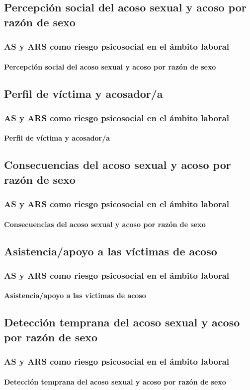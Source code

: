 \documentclass{beamer}
\begin{document}
    \subsection{Percepción social del acoso sexual y acoso por razón de sexo}
    \begin{frame}
		\frametitle{AS y ARS como riesgo psicosocial en el ámbito laboral}
        \framesubtitle{Percepción social del acoso sexual y acoso por razón de sexo}
	\end{frame}

    \subsection{Perfil de víctima y acosador/a}
    \begin{frame}
		\frametitle{AS y ARS como riesgo psicosocial en el ámbito laboral}
        \framesubtitle{Perfil de víctima y acosador/a}
	\end{frame}

    \subsection{Consecuencias del acoso sexual y acoso por razón de sexo}
    \begin{frame}
		\frametitle{AS y ARS como riesgo psicosocial en el ámbito laboral}
        \framesubtitle{Consecuencias del acoso sexual y acoso por razón de sexo}
	\end{frame}

    \subsection{Asistencia/apoyo a las víctimas de acoso}
    \begin{frame}
		\frametitle{AS y ARS como riesgo psicosocial en el ámbito laboral}
        \framesubtitle{Asistencia/apoyo a las víctimas de acoso}
	\end{frame}

    \subsection{Detección temprana del acoso sexual y acoso por razón de sexo}
    \begin{frame}
		\frametitle{AS y ARS como riesgo psicosocial en el ámbito laboral}
        \framesubtitle{Detección temprana del acoso sexual y acoso por razón de sexo}
	\end{frame}
\end{document}
